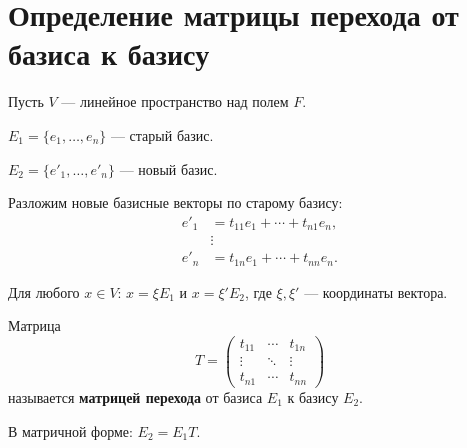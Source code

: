 \section{Определение матрицы перехода от базиса к базису}

\begin{definition}
Пусть $V$ --- линейное пространство над полем $F$.

$E_1 = \{e_1, \ldots, e_n\}$ --- старый базис.

$E_2 = \{e'_1, \ldots, e'_n\}$ --- новый базис.

Разложим новые базисные векторы по старому базису:
\begin{align*}
e'_1 &= t_{11}e_1 + \cdots + t_{n1}e_n, \\
&\vdots \\
e'_n &= t_{1n}e_1 + \cdots + t_{nn}e_n.
\end{align*}

Для любого $x \in V$: $x = \xi E_1$ и $x = \xi' E_2$, где $\xi, \xi'$ --- координаты вектора.

Матрица
\[
T = \begin{pmatrix}
t_{11} & \cdots & t_{1n} \\
\vdots & \ddots & \vdots \\
t_{n1} & \cdots & t_{nn}
\end{pmatrix}
\]
называется \textbf{матрицей перехода} от базиса $E_1$ к базису $E_2$.

В матричной форме: $E_2 = E_1 T$.
\end{definition}
